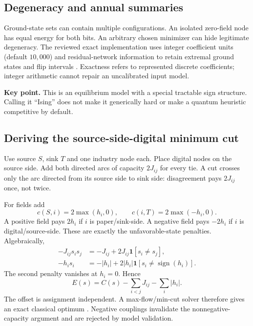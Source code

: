 \documentclass[11pt,letterpaper]{article}
\newcommand{\takeaway}[1]{\par\smallskip\textbf{Key point.} #1\par}
\begin{document}
\subsection{Degeneracy and annual summaries}
Ground-state sets can contain multiple configurations. An isolated zero-field node has equal energy for both bits. An arbitrary chosen minimizer can hide legitimate degeneracy. The reviewed exact implementation uses integer coefficient units (default $10{,}000$) and residual-network information to retain extremal ground states and flip intervals \cite{exact}. Exactness refers to represented discrete coefficients; integer arithmetic cannot repair an uncalibrated input model.

\takeaway{This is an equilibrium model with a special tractable sign structure. Calling it ``Ising'' does not make it generically hard or make a quantum heuristic competitive by default.}
\subsection{Deriving the source-side-digital minimum cut}\label{sec:mincut}
Use source $S$, sink $T$ and one industry node each. Place digital nodes on the source side. Add both directed arcs of capacity $2J_{ij}$ for every tie. A cut crosses only the arc directed from its source side to sink side: disagreement pays $2J_{ij}$ once, not twice.

For fields add
\begin{equation}
 c(S,i)=2\max(h_i,0),\qquad c(i,T)=2\max(-h_i,0).\label{eq:arcs}
\end{equation}
A positive field pays $2h_i$ if $i$ is paper/sink-side. A negative field pays $-2h_i$ if $i$ is digital/source-side. These are exactly the unfavorable-state penalties. Algebraically,
\begin{align}
 -J_{ij}s_is_j&=-J_{ij}+2J_{ij}\mathbf1[s_i\ne s_j],\\
 -h_i s_i&=-|h_i|+2|h_i|\mathbf1[s_i\ne\operatorname{sign}(h_i)].
\end{align}
The second penalty vanishes at $h_i=0$. Hence
\begin{equation}
 \boxed{E(s)=C(s)-\sum_{i<j}J_{ij}-\sum_i|h_i|.}\label{eq:offset}
\end{equation}
The offset is assignment independent. A max-flow/min-cut solver therefore gives an exact classical optimum \cite{exact}. Negative couplings invalidate the nonnegative-capacity argument and are rejected by model validation.
\end{document}
